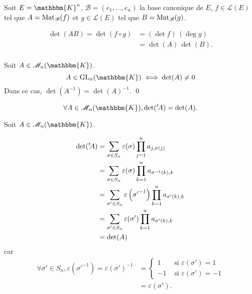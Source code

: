 \begin{prv}
	Soit $E = \mathbbm{K}^n$, $\mathcal{B} = (e_1, \ldots, e_n)$ la base canonique de $E$, $f \in \mathcal{L}(E)$ tel que $A = \operatorname{Mat}_\mathcal{B}(f)$ et $g \in \mathcal{L}(E)$ tel que $B = \operatorname{Mat}_\mathcal{B}(g)$.

	\begin{align*}
		\det(AB) = \det(f \circ g) &= (\det f)\,(\deg g)\\
		&= \det(A)\,\det(B). \\
	\end{align*}
\end{prv}

\begin{prop}
	Soit $A \in \mathcal{M}_n(\mathbbm{K})$. \[
		A \in \mathrm{GL}_n(\mathbbm{K}) \iff \det(A) \neq 0
	\] Dans ce cas, $\det(A^{-1}) = \det(A)^{-1}$.
	\qed
\end{prop}

\begin{prop}
	\[
		\forall A \in \mathcal{M}_n(\mathbbm{K}), \det(\t A) = \det(A).
	\]
\end{prop}

\begin{prv}
	Soit $A \in \mathcal{M}_n(\mathbbm{K})$.

	\begin{align*}
		\operatorname{det}({}^t\! A) &= \sum_{\sigma \in S_n} \varepsilon(\sigma) \prod_{j=1}^n a_{j, \sigma(j)}\\
		&= \sum_{\sigma \in S_n} \varepsilon(\sigma) \prod_{k=1}^n a_{\sigma^{-1}(k), k}  \\
		&= \sum_{\sigma' \in S_n}\varepsilon\left({\sigma'}^{-1}\right) \prod_{k=1}^n a_{\sigma'(k), k} \\
		&= \sum_{\sigma' \in S_n} \varepsilon(\sigma') \prod_{k=1}^n a_{\sigma'(k),k} \\
		&= \operatorname{det}(A) \\
	\end{align*}
	car
	\begin{align*}
		\forall \sigma' \in S_n, \varepsilon\left( {\sigma'}^{-1} \right) = \varepsilon(\sigma')^{-1} &= \begin{cases}
			1 &\text{ si } \varepsilon(\sigma') = 1\\
			-1 &\text{ si } \varepsilon(\sigma') = -1
		\end{cases} \\
		&= \varepsilon(\sigma').
	\end{align*}
\end{prv}


